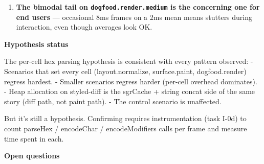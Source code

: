 \begin{enumerate}
\item
  \textbf{The bimodal tail on \texttt{d\allowbreak{}o\allowbreak{}g\allowbreak{}f\allowbreak{}o\allowbreak{}o\allowbreak{}d\allowbreak{}.\allowbreak{}r\allowbreak{}e\allowbreak{}n\allowbreak{}d\allowbreak{}e\allowbreak{}r\allowbreak{}.\allowbreak{}m\allowbreak{}e\allowbreak{}d\allowbreak{}i\allowbreak{}u\allowbreak{}m} is the concerning one for end users} --- occasional 8ms frames on a 2ms mean means stutters during interaction, even though averages look OK.
\end{enumerate}

\textbf{Hypothesis status}

The per-cell hex parsing hypothesis is consistent with every pattern observed: - Scenarios that set every cell (layout.normalize, surface.paint, dogfood.render) regress hardest. - Smaller scenarios regress harder (per-cell overhead dominates). - Heap allocation on styled-diff is the sgrCache + string concat side of the same story (diff path, not paint path). - The control scenario is unaffected.

But it's still a hypothesis. Confirming requires instrumentation (task I-0d) to count parseHex / encodeChar / encodeModifiers calls per frame and measure time spent in each.

\textbf{Open questions}

